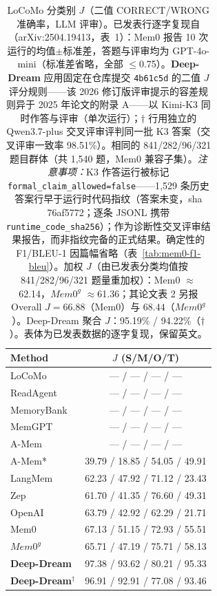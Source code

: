 \begin{table}[t]
\centering
\caption{LoCoMo 分类别 $J$（二值 CORRECT/WRONG 准确率，LLM 评审）。已发表行逐字复现自 \citet{chhikara2025mem0}（arXiv:2504.19413，表~1）：Mem0 报告 10 次运行的均值$\pm$标准差，答题与评审均为 GPT-4o-mini（标准差省略，全部 $\le$0.75）。\textbf{Deep-Dream} 应用固定在仓库提交 \texttt{4b61c5d} 的二值 $J$ 评分规则——该 2026 修订版评审提示的容差规则异于 2025 年论文的附录 A——以 Kimi-K3 同时作答与评审（单次运行）；$\dagger$ 行用独立的 Qwen3.7-plus 交叉评审评判同一批 K3 答案（交叉评审一致率 98.51\%）。相同的 841/282/96/321 题目群体（共 1{,}540 题，Mem0 兼容子集）。\emph{注意事项：}K3 作答运行被标记 \texttt{formal\_claim\_allowed=false}——1{,}529 条历史答案行早于运行时代码指纹（答案未变，sha 76af5772；逐条 JSONL 携带 \texttt{runtime\_code\_sha256}）；作为诊断性交叉评审结果报告，而非指纹完备的正式结果。确定性的 F1/BLEU-1 因篇幅省略（表~\ref{tab:mem0-f1-bleu}）。加权 $J$（由已发表分类均值按 841/282/96/321 题量重加权）：Mem0 $\approx$62.14，$Mem0^g$ $\approx$61.36；其论文表 2 另报 Overall $J=66.88$（Mem0）与 $68.44$（$Mem0^g$）。Deep-Dream 聚合 $J$：95.19\% / 94.22\%（$\dagger$）。表体为已发表数据的逐字复现，保留英文。}
\label{tab:mem0-baselines}
\footnotesize
\setlength{\tabcolsep}{5pt}
\begin{tabular}{lc}
\toprule
Method & $J$ (S/M/O/T) \\
\midrule
LoCoMo & --- / --- / --- / --- \\
ReadAgent & --- / --- / --- / --- \\
MemoryBank & --- / --- / --- / --- \\
MemGPT & --- / --- / --- / --- \\
A-Mem & --- / --- / --- / --- \\
A-Mem* & 39.79 / 18.85 / 54.05 / 49.91 \\
LangMem & 62.23 / 47.92 / 71.12 / 23.43 \\
Zep & 61.70 / 41.35 / 76.60 / 49.31 \\
OpenAI & 63.79 / 42.92 / 62.29 / 21.71 \\
Mem0 & 67.13 / 51.15 / 72.93 / 55.51 \\
$Mem0^g$ & 65.71 / 47.19 / 75.71 / 58.13 \\
\textbf{Deep-Dream} & 97.38 / 93.62 / 80.21 / 95.33 \\
\textbf{Deep-Dream}$^\dagger$ & 96.91 / 92.91 / 77.08 / 93.46 \\
\bottomrule
\end{tabular}
\end{table}

